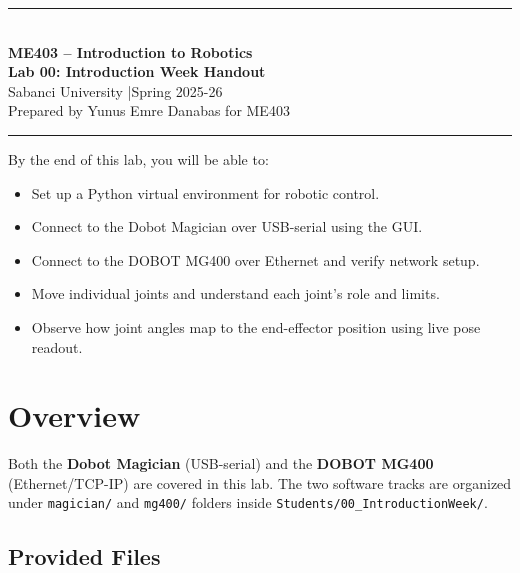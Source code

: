 \documentclass[11pt,a4paper]{article}
\begin{document}
\thispagestyle{fancy}
\begin{center}
  \rule{\linewidth}{1.5pt}\\[8pt]
  {\LARGE\bfseries ME403 -- Introduction to Robotics}\\[4pt]
  {\large\bfseries Lab 00: Introduction Week Handout}\\[4pt]
  {\normalsize Sabanci University \quad|\quad Spring 2025-26}\\[4pt]
  {\small Prepared by Yunus Emre Danabas for ME403}\\[6pt]
  \rule{\linewidth}{1.5pt}
\end{center}

\vspace{5pt}

\begin{tcolorbox}[outcomebox]
  By the end of this lab, you will be able to:
  \begin{itemize}
    \item Set up a Python virtual environment for robotic control.
    \item Connect to the Dobot Magician over USB-serial using the GUI.
    \item Connect to the DOBOT MG400 over Ethernet and verify network setup.
    \item Move individual joints and understand each joint's role and limits.
    \item Observe how joint angles map to the end-effector position using live pose readout.
  \end{itemize}
\end{tcolorbox}

\section{Overview}

Both the \textbf{Dobot Magician} (USB-serial) and the \textbf{DOBOT MG400} (Ethernet/TCP-IP)
are covered in this lab. The two software tracks are organized under \texttt{magician/} and \texttt{mg400/} folders
inside \texttt{Students/00\_IntroductionWeek/}.

\subsection*{Provided Files}
\end{document}
